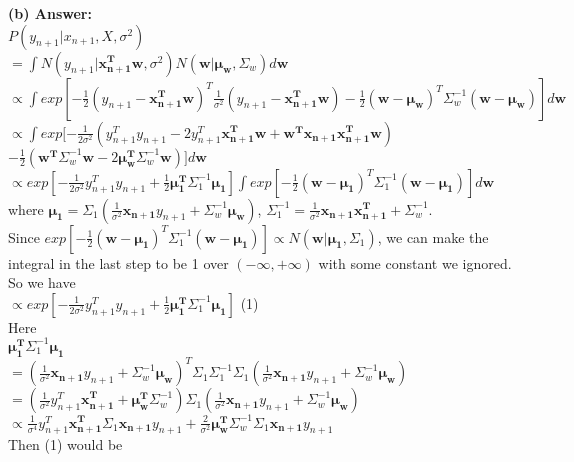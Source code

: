 \documentclass{article}
\begin{document}
\noindent
\textbf{(b) Answer:}\\
$P(y_{n+1}|x_{n+1},X,\sigma^2)$\\
$= \int N(y_{n+1}|\mathbf{x_{n+1}^{T}} \mathbf{w},\sigma^2) N(\mathbf{w}|\mathbf{\mu_w},\Sigma_w) d \mathbf{w}$\\
$\propto \int exp[-\frac{1}{2}(y_{n+1}-\mathbf{x_{n+1}^{T}} \mathbf{w})^T \frac{1}{\sigma^2}(y_{n+1}-\mathbf{x_{n+1}^{T}} \mathbf{w})-\frac{1}{2}(\mathbf{w-\mu_w})^T \Sigma_{w}^{-1}(\mathbf{w-\mu_w})]d\mathbf{w}$\\
$\propto \int exp[-\frac{1}{2\sigma^{2}}(y_{n+1}^T y_{n+1}-2 y_{n+1}^T \mathbf{x_{n+1}^T w}+\mathbf{w^T x_{n+1}x_{n+1}^T w})$\\
$-\frac{1}{2}(\mathbf{w^T} \Sigma_{w}^{-1} \mathbf{w}-2 \mathbf{\mu_{w}^T} \Sigma_w^{-1} \mathbf{w})]d\mathbf{w}$\\
$\propto exp[-\frac{1}{2 \sigma^2}y_{n+1}^T y_{n+1} + \frac{1}{2}\mathbf{\mu_1^T} \Sigma_1^{-1}\mathbf{\mu_1}] \int exp[-\frac{1}{2}(\mathbf{w-\mu_1})^T \Sigma_{1}^{-1}(\mathbf{w-\mu_1})]d\mathbf{w}$\\
where $\mathbf{\mu_1} = \Sigma_1 (\frac{1}{\sigma^2}\mathbf{x_{n+1}}y_{n+1} + \Sigma_{w}^{-1}\mathbf{\mu_w})$, $\Sigma_1^{-1} = \frac{1}{\sigma^2}\mathbf{x_{n+1}x_{n+1}^T} + \Sigma_{w}^{-1}$.\\
Since $exp[-\frac{1}{2}(\mathbf{w-\mu_1})^T \Sigma_{1}^{-1}(\mathbf{w-\mu_1})] \propto N(\mathbf{w}|\mathbf{\mu_1},\Sigma_1)$, we can make the integral in the last step to be 1 over $(-\infty, +\infty)$ with some constant we ignored. So we have\\
$\propto exp[-\frac{1}{2 \sigma^2}y_{n+1}^T y_{n+1} + \frac{1}{2}\mathbf{\mu_1^T} \Sigma_1^{-1}\mathbf{\mu_1}]$ (1)\\
Here \\
$\mathbf{\mu_1^T} \Sigma_1^{-1}\mathbf{\mu_1}$\\
$= (\frac{1}{\sigma^2}\mathbf{x_{n+1}}y_{n+1} + \Sigma_{w}^{-1}\mathbf{\mu_w})^T \Sigma_1 \Sigma_1^{-1} \Sigma_1 (\frac{1}{\sigma^2}\mathbf{x_{n+1}}y_{n+1} + \Sigma_{w}^{-1}\mathbf{\mu_w})$\\
$= (\frac{1}{\sigma^2} y_{n+1}^T \mathbf{x_{n+1}^T + \mu_w ^T} \Sigma_w^{-1})\Sigma_1 (\frac{1}{\sigma^2}\mathbf{x_{n+1}}y_{n+1} + \Sigma_{w}^{-1}\mathbf{\mu_w})$\\
$\propto \frac{1}{\sigma^4} y_{n+1}^T \mathbf{x_{n+1}^T} \Sigma_1 \mathbf{x_{n+1}}y_{n+1} + \frac{2}{\sigma^2} \mathbf{\mu_w ^T}\Sigma_w^{-1} \Sigma_1 \mathbf{x_{n+1}}y_{n+1}$\\
Then (1) would be\\
\end{document}
